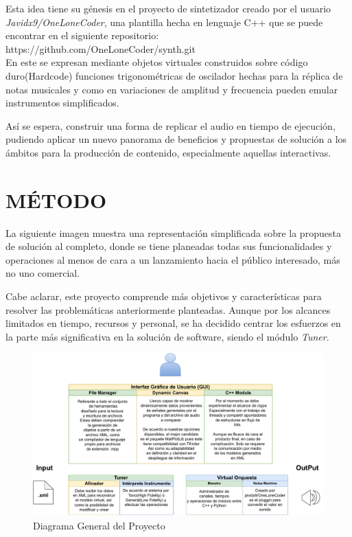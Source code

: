 \documentclass{book}
\begin{document}
	Esta idea tiene su génesis en el proyecto de sintetizador creado por el usuario \emph{Javidx9/OneLoneCoder}, una plantilla hecha en lenguaje C++ que se puede encontrar en el siguiente repositorio: \color{blue}https://github.com/OneLoneCoder/synth.git \color{black}\\En este se expresan mediante objetos virtuales construidos sobre código duro(Hardcode) funciones trigonométricas de oscilador hechas para la réplica de notas musicales y como en variaciones de amplitud y frecuencia pueden emular instrumentos simplificados.\par
	Así se espera, construir una forma de replicar el audio en tiempo de ejecución, pudiendo aplicar un nuevo panorama de beneficios y propuestas de solución a los ámbitos para la producción de contenido, especialmente aquellas interactivas.\par
	\pagebreak
	\section*{MÉTODO}
	La siguiente imagen muestra una representación simplificada sobre la propuesta de solución al completo, donde se tiene planeadas todas sus funcionalidades y operaciones al menos de cara a un lanzamiento hacia el público interesado, más no uno comercial.\par
	
	Cabe aclarar, este proyecto comprende más objetivos y características para resolver las problemáticas anteriormente planteadas. Aunque por los alcances limitados en tiempo, recursos y personal, se ha decidido centrar los esfuerzos en la parte más significativa en la solución de software, siendo el módulo \emph{Tuner}.
	\begin{figure}[h]
		\includegraphics[width=1.25\linewidth]{../Assets/images/musiC++_Diagram_cut}
		\caption{ Diagrama General del Proyecto}
	\end{figure} 
	
\end{document}
